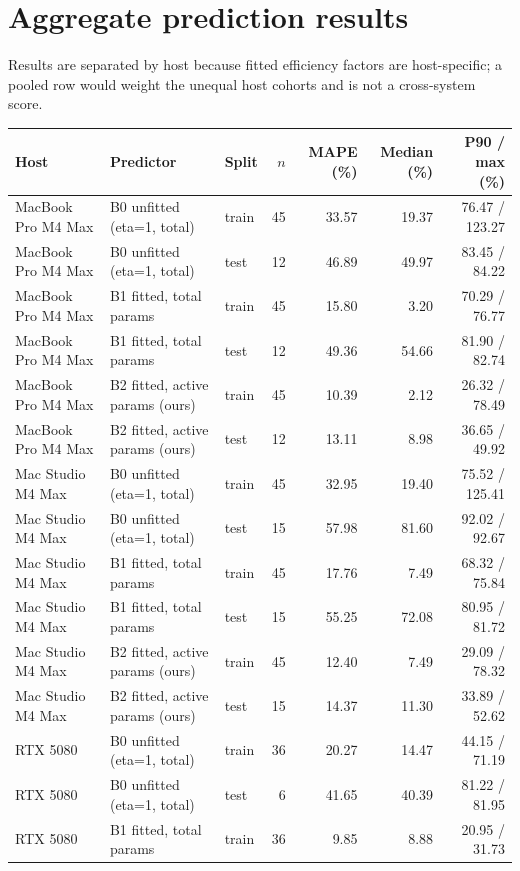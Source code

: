 \documentclass[10pt]{article}
\begin{document}
\section{Aggregate prediction results}
Results are separated by host because fitted efficiency factors are host-specific; a pooled row would weight the unequal host cohorts and is not a cross-system score.
\begin{center}
\small
\begin{tabular}{lllrrrr}
\toprule
Host & Predictor & Split & $n$ & MAPE (\%) & Median (\%) & P90 / max (\%)\\
\midrule
MacBook Pro M4 Max & B0 unfitted (eta=1, total) & train & 45 & 33.57 & 19.37 & 76.47 / 123.27 \\
MacBook Pro M4 Max & B0 unfitted (eta=1, total) & test & 12 & 46.89 & 49.97 & 83.45 / 84.22 \\
MacBook Pro M4 Max & B1 fitted, total params & train & 45 & 15.80 & 3.20 & 70.29 / 76.77 \\
MacBook Pro M4 Max & B1 fitted, total params & test & 12 & 49.36 & 54.66 & 81.90 / 82.74 \\
MacBook Pro M4 Max & B2 fitted, active params (ours) & train & 45 & 10.39 & 2.12 & 26.32 / 78.49 \\
MacBook Pro M4 Max & B2 fitted, active params (ours) & test & 12 & 13.11 & 8.98 & 36.65 / 49.92 \\
Mac Studio M4 Max & B0 unfitted (eta=1, total) & train & 45 & 32.95 & 19.40 & 75.52 / 125.41 \\
Mac Studio M4 Max & B0 unfitted (eta=1, total) & test & 15 & 57.98 & 81.60 & 92.02 / 92.67 \\
Mac Studio M4 Max & B1 fitted, total params & train & 45 & 17.76 & 7.49 & 68.32 / 75.84 \\
Mac Studio M4 Max & B1 fitted, total params & test & 15 & 55.25 & 72.08 & 80.95 / 81.72 \\
Mac Studio M4 Max & B2 fitted, active params (ours) & train & 45 & 12.40 & 7.49 & 29.09 / 78.32 \\
Mac Studio M4 Max & B2 fitted, active params (ours) & test & 15 & 14.37 & 11.30 & 33.89 / 52.62 \\
RTX 5080 & B0 unfitted (eta=1, total) & train & 36 & 20.27 & 14.47 & 44.15 / 71.19 \\
RTX 5080 & B0 unfitted (eta=1, total) & test & 6 & 41.65 & 40.39 & 81.22 / 81.95 \\
RTX 5080 & B1 fitted, total params & train & 36 & 9.85 & 8.88 & 20.95 / 31.73 \\

\end{tabular}
\end{center}
\end{document}
